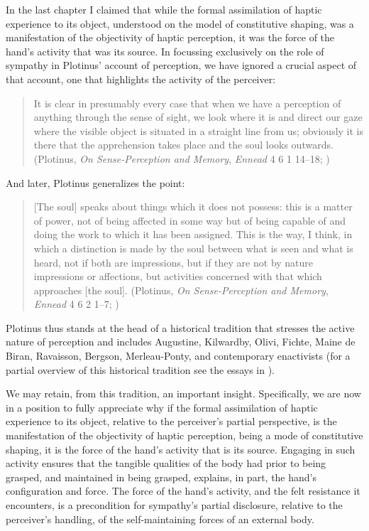 In the last chapter I claimed that while the formal assimilation of haptic experience to its object, understood on the model of constitutive shaping, was a manifestation of the objectivity of haptic perception, it was the force of the hand's activity that was its source. In focussing exclusively on the role of sympathy in Plotinus' account of perception, we have ignored a crucial aspect of that account, one that highlights the activity of the perceiver:
\begin{quote}
	It is clear in presumably every case that when we have a perception of anything through the sense of sight, we look where it is and direct our gaze where the visible object is situated in a straight line from us; obviously it is there that the apprehension takes place and the soul looks outwards. (Plotinus, \emph{On Sense-Perception and Memory}, \emph{Ennead} 4 6 1 14--18; \citealt[321]{Armstrong:1984aa})
\end{quote}
And later, Plotinus generalizes the point:
\begin{quote}
	[The soul] speaks about things which it does not possess: this is a matter of power, not of being affected in some way but of being capable of and doing the work to which it has been assigned. This is the way, I think, in which a distinction is made by the soul between what is seen and what is heard, not if both are impressions, but if they are not by nature impressions or affections, but activities concerned with that which approaches [the soul]. (Plotinus, \emph{On Sense-Perception and Memory}, \emph{Ennead} 4 6 2 1--7; \citealt[325]{Armstrong:1984aa})
\end{quote}
Plotinus thus stands at the head of a historical tradition that stresses the active nature of perception and includes Augustine, Kilwardby, Olivi, Fichte, Maine de Biran, Ravaisson, Bergson, Merleau-Ponty, and contemporary enactivists (for a partial overview of this historical tradition see the essays in \citealt{Silva:2014cl}). 

We may retain, from this tradition, an important insight. Specifically, we are now in a position to fully appreciate why if the formal assimilation of haptic experience to its object, relative to the perceiver's partial perspective, is the manifestation of the objectivity of haptic perception, being a mode of constitutive shaping, it is the force of the hand's activity that is its source. Engaging in such activity ensures that the tangible qualities of the body had prior to being grasped, and maintained in being grasped, explains, in part, the hand’s configuration and force. The force of the hand's activity, and the felt resistance it encounters, is a precondition for sympathy's partial disclosure, relative to the perceiver's handling, of the self-maintaining forces of an external body.

